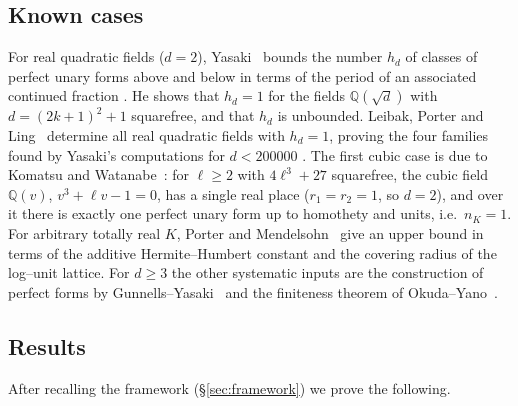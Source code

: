 \documentclass[11pt,reqno]{amsart}
\theoremstyle{plain}
\theoremstyle{definition}
\newcommand{\Q}{\mathbb{Q}}
\newcommand{\nK}{n_K}
\begin{document}
\subsection{Known cases}
For real quadratic fields ($d=2$), Yasaki~\cite{Yasaki} bounds the number $h_d$ of classes of perfect unary
forms above and below in terms of the period of an associated continued fraction \cite[Thm.~5.1]{Yasaki}.
He shows that $h_d=1$ for the fields $\Q(\sqrt d)$ with $d=(2k+1)^2+1$ squarefree, and that $h_d$ is unbounded.
Leibak, Porter and Ling~\cite{LPL} determine all real quadratic fields with $h_d=1$, proving the four
families found by Yasaki's computations for $d<200000$ \cite[Remark after Cor.~5.1]{Yasaki}. The first cubic case is due to Komatsu and Watanabe~\cite{KW}: for $\ell\ge2$ with $4\ell^3+27$
squarefree, the cubic field $\Q(v)$, $v^3+\ell v-1=0$, has a single real place ($r_1=r_2=1$, so $d=2$), and
over it there is exactly one perfect unary form up to homothety and units, i.e.\ $\nK=1$. For arbitrary totally real $K$, Porter and Mendelsohn~\cite{PM} give an upper bound in terms of
the additive Hermite--Humbert constant and the covering radius of the log--unit lattice. For $d\ge3$ the
other systematic inputs are the construction of perfect forms by Gunnells--Yasaki~\cite{GY} and the
finiteness theorem of Okuda--Yano~\cite{OY}.

\subsection{Results}
After recalling the framework (\S\ref{sec:framework}) we prove the following.
\end{document}
